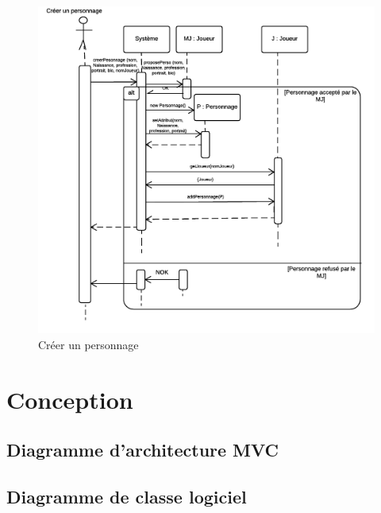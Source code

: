 \documentclass[a4paper,oneside,10pt]{article}
\begin{document}
\begin{figure}[H]
	\begin{center}
		\includegraphics[width=12cm]{images/sequence/DS-CreerPerso.png}  
		\caption{Créer un personnage}
	\end{center}
\end{figure}


\pagebreak

\section{Conception}


\subsection{Diagramme d'architecture MVC}


\subsection{Diagramme de classe logiciel}
\end{document}
